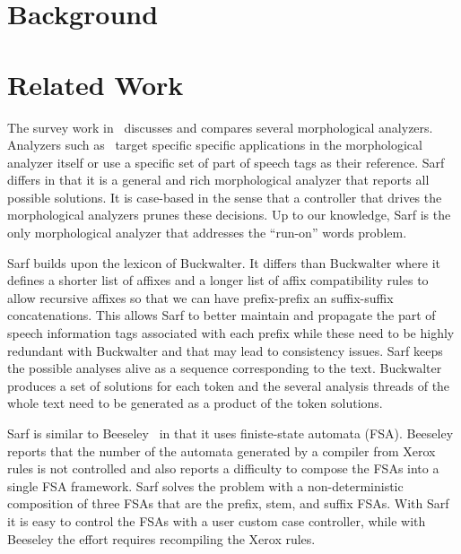 \documentclass[11pt,letterpaper]{article}
\begin{document}



\section{Background}

\section{Related Work }

The survey work in~\cite{Sughaiyer:04} discusses and compares
several morphological analyzers. 
Analyzers such as~\cite{Khoja:01,Darwish:02} 
target specific specific applications in the morphological 
analyzer itself or use a specific set of part of speech tags
as their reference.
Sarf differs in that it is a general and rich morphological 
analyzer that reports all possible solutions. 
It is case-based in the sense that a controller that drives
the morphological analyzers prunes these decisions. 
Up to our knowledge, Sarf is the only morphological analyzer
that addresses the ``run-on'' words problem. 

Sarf builds upon the lexicon of Buckwalter.
It differs than Buckwalter where it defines a shorter list of affixes
and a longer list of affix compatibility rules to allow recursive 
affixes so that we can have prefix-prefix an suffix-suffix 
concatenations.
This allows Sarf to better maintain and propagate 
the part of speech information
tags associated with each prefix while these need to be highly 
redundant with Buckwalter and that may lead to consistency issues. 
Sarf keeps the possible analyses alive as a sequence corresponding
to the text. Buckwalter produces a set of solutions for each token 
and the several analysis threads of the whole text need to be 
generated as a product of the token solutions. 

Sarf is similar to Beeseley~ in that it uses
finiste-state automata (FSA). 
Beeseley reports that the number of the automata generated by a compiler
from Xerox rules is not controlled and also reports a difficulty to 
compose the FSAs into a single FSA framework. 
Sarf solves the problem with a non-deterministic composition of three
FSAs that are the prefix, stem, and suffix FSAs. 
With Sarf it is easy to control the FSAs with a user custom case 
controller, while with Beeseley the effort requires recompiling the
Xerox rules.
\end{document}
